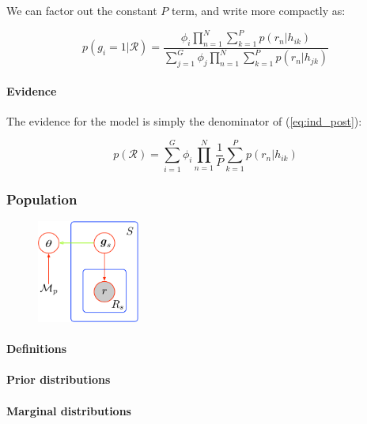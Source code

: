 \documentclass{article}
\begin{document}
We can factor out the constant $P$ term, and write more compactly as:

\begin{equation}
\label{eq:ind_post2}
 p(g_i = 1 | \mathcal{R}) = \frac{\phi_i \prod^N_{n = 1} \sum^P_{k = 1} p(r_n | h_{ik})}{\sum_{j = 1}^G \phi_j \prod^N_{n = 1} \sum^P_{k = 1} p(r_n | h_{jk})}
\end{equation}

\paragraph{Evidence}

The evidence for the model is simply the denominator of (\ref{eq:ind_post}):

\begin{equation}
\label{eq:ind_ev}
 p(\mathcal{R}) = \sum_{i = 1}^G \phi_i \prod^N_{n = 1} \frac{1}{P} \sum^P_{k = 1} p(r_n | h_{ik})
\end{equation}

\subsubsection{Population}

\begin{figure}[ht!]
    \centering
    \includegraphics[width=0.3\textwidth]{figures/population_model}
\end{figure}

\paragraph{Definitions}

\paragraph{Prior distributions}

\paragraph{Marginal distributions}
\end{document}
